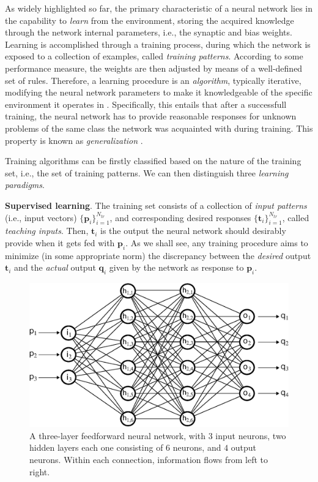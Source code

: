 \documentclass[12pt, a4paper, twoside, openright]{report}
\numberwithin{equation}{chapter}
\theoremstyle{theorem}
\theoremstyle{definition}
\theoremstyle{remark}
\theoremstyle{proposition}
\numberwithin{figure}{chapter}
\begin{document}
		As widely highlighted so far, the primary characteristic of a neural network lies in the capability to \emph{learn} from the environment, storing the acquired knowledge through the network internal parameters, i.e., the synaptic and bias weights. Learning is accomplished through a training process, during which the network is exposed to a collection of examples, called \emph{training patterns}. According to some performance measure, the weights are then adjusted by means of a well-defined set of rules. Therefore, a learning procedure is an \emph{algorithm}, typically iterative, modifying the neural network parameters to make it knowledgeable of the specific environment it operates in \cite{Hay05}. Specifically, this entails that after a successfull training, the neural network has to provide reasonable responses for unknown problems of the same class the network was acquainted with during training. This property is known as \emph{generalization} \cite{Kri}. 
		
		Training algorithms can be firstly classified based on the nature of the training set, i.e., the set of training patterns. We can then distinguish three \emph{learning paradigms}.
		
		\vspace*{0.3cm}
		
		\noindent \textbf{Supervised learning}. The training set consists of a collection of \emph{input patterns} (i.e., input vectors) $\big\lbrace \mathbf{p}_i \big\rbrace_{i = 1}^{N_{tr}}$, and corresponding desired responses $\big\lbrace \mathbf{t}_i \big\rbrace_{i = 1}^{N_{tr}}$, called \emph{teaching inputs}. Then, $\mathbf{t}_i$ is the output the neural network should desirably provide when it gets fed with $\mathbf{p}_i$. As we shall see, any training procedure aims to minimize (in some appropriate norm) the discrepancy between the \emph{desired} output $\mathbf{t}_i$ and the \emph{actual} output $\mathbf{q}_i$ given by the network as response to $\mathbf{p}_i$. 
		
		\vspace*{0.3cm}
		
		\begin{figure}[t]
			\center
			\includegraphics[scale = 0.6]{neural_network_bis.eps}
			
			\caption{A three-layer feedforward neural network, with $3$ input neurons, two hidden layers each one consisting of $6$ neurons, and $4$ output neurons. Within each connection, information flows from left to right.}
			\label{fig:neural-network}
		\end{figure}
		
\end{document}
